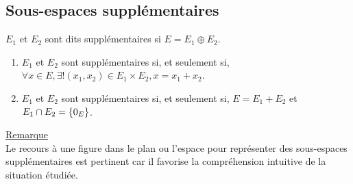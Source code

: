 \subsection{Sous-espaces supplémentaires}
\begin{defi}
    \(E_1\) et \(E_2\) sont dits supplémentaires si \(E = E_1 \oplus  E_2\).
\end{defi}
\begin{defprop}
    \begin{enumerate}
        \item \(E_1\) et \(E_2\) sont supplémentaires si, et seulement si, \(\forall x \in  E, \exists !(x_1, x_2) \in  E_1 \times E_2, x = x_1 + x_2\).
        \item \(E_1\) et \(E_2\) sont supplémentaires si, et seulement si, \(E = E_1 + E_2\) et \(E_1 \cap E_2 = \left\lbrace0_E \right\rbrace\).
    \end{enumerate}
    \underline{Remarque}\\
    Le recours à une figure dans le plan ou l’espace pour représenter des sous-espaces supplémentaires est pertinent car il favorise la compréhension intuitive de la situation étudiée.
\end{defprop}
